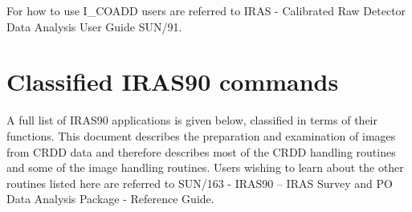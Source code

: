 \documentclass[twoside,11pt]{article}
\newcommand{\xref}[3]{#1}
\newcommand{\xlabel}[1]{}
\begin{document}
For how to use I\_COADD users are referred to IRAS - Calibrated Raw Detector
Data Analysis User Guide \xref{SUN/91}{sun91}{}.
 
\section{Classified IRAS90 commands
\xlabel{classified_iras90_commands}\label{m:otheriras90}}

A full list of {\small IRAS90} applications is given below, classified in terms
of their functions. This document describes the preparation and examination
of images from CRDD data and therefore describes most of the CRDD handling
routines and some of the image handling routines. Users wishing to learn about
the other routines listed here are referred to 
\xref{SUN/163}{sun163}{} - IRAS90 -- IRAS Survey
and PO Data Analysis Package - Reference Guide.
\end{document}
